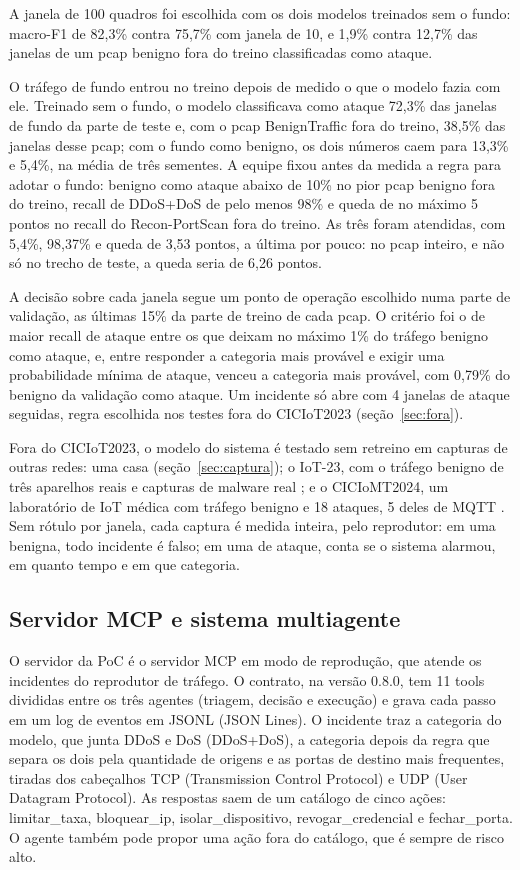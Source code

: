 A janela de 100 quadros foi escolhida com os dois modelos treinados sem o fundo: macro-F1 de 82,3\% contra 75,7\% com janela de 10, e 1,9\% contra 12,7\% das janelas de um pcap benigno fora do treino classificadas como ataque.

O tráfego de fundo entrou no treino depois de medido o que o modelo fazia com ele. Treinado sem o fundo, o modelo classificava como ataque 72,3\% das janelas de fundo da parte de teste e, com o pcap BenignTraffic fora do treino, 38,5\% das janelas desse pcap; com o fundo como benigno, os dois números caem para 13,3\% e 5,4\%, na média de três sementes. A equipe fixou antes da medida a regra para adotar o fundo: benigno como ataque abaixo de 10\% no pior pcap benigno fora do treino, recall de DDoS+DoS de pelo menos 98\% e queda de no máximo 5 pontos no recall do Recon-PortScan fora do treino. As três foram atendidas, com 5,4\%, 98,37\% e queda de 3,53 pontos, a última por pouco: no pcap inteiro, e não só no trecho de teste, a queda seria de 6,26 pontos.

A decisão sobre cada janela segue um ponto de operação escolhido numa parte de validação, as últimas 15\% da parte de treino de cada pcap. O critério foi o de maior recall de ataque entre os que deixam no máximo 1\% do tráfego benigno como ataque, e, entre responder a categoria mais provável e exigir uma probabilidade mínima de ataque, venceu a categoria mais provável, com 0,79\% do benigno da validação como ataque. Um incidente só abre com 4 janelas de ataque seguidas, regra escolhida nos testes fora do CICIoT2023 (seção~\ref{sec:fora}).

Fora do CICIoT2023, o modelo do sistema é testado sem retreino em capturas de outras redes: uma casa (seção~\ref{sec:captura}); o IoT-23, com o tráfego benigno de três aparelhos reais e capturas de malware real \cite{garcia2020iot23}; e o CICIoMT2024, um laboratório de IoT médica com tráfego benigno e 18 ataques, 5 deles de MQTT \cite{dadkhah2024}. Sem rótulo por janela, cada captura é medida inteira, pelo reprodutor: em uma benigna, todo incidente é falso; em uma de ataque, conta se o sistema alarmou, em quanto tempo e em que categoria.

\subsection{Servidor MCP e sistema multiagente}
\label{sec:mcp}

O servidor da PoC é o servidor MCP em modo de reprodução, que atende os incidentes do reprodutor de tráfego. O contrato, na versão 0.8.0, tem 11 tools divididas entre os três agentes (triagem, decisão e execução) e grava cada passo em um log de eventos em JSONL (JSON Lines). O incidente traz a categoria do modelo, que junta DDoS e DoS (DDoS+DoS), a categoria depois da regra que separa os dois pela quantidade de origens e as portas de destino mais frequentes, tiradas dos cabeçalhos TCP (Transmission Control Protocol) e UDP (User Datagram Protocol). As respostas saem de um catálogo de cinco ações: limitar\_taxa, bloquear\_ip, isolar\_dispositivo, revogar\_credencial e fechar\_porta. O agente também pode propor uma ação fora do catálogo, que é sempre de risco alto.

